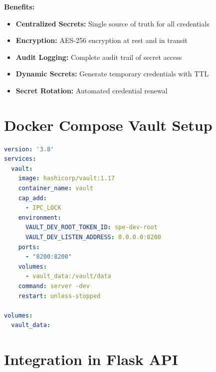 \documentclass[12pt,a4paper]{report}
\begin{document}
\textbf{Benefits:}
\begin{itemize}[leftmargin=2em]
    \item \textbf{Centralized Secrets:} Single source of truth for all credentials
    \item \textbf{Encryption:} AES-256 encryption at rest and in transit
    \item \textbf{Audit Logging:} Complete audit trail of secret access
    \item \textbf{Dynamic Secrets:} Generate temporary credentials with TTL
    \item \textbf{Secret Rotation:} Automated credential renewal
\end{itemize}

\section{Docker Compose Vault Setup}

\begin{lstlisting}[language=yaml, caption={docker-compose.vault.yml}]
version: '3.8'
services:
  vault:
    image: hashicorp/vault:1.17
    container_name: vault
    cap_add:
      - IPC_LOCK
    environment:
      VAULT_DEV_ROOT_TOKEN_ID: spe-dev-root
      VAULT_DEV_LISTEN_ADDRESS: 0.0.0.0:8200
    ports:
      - "8200:8200"
    volumes:
      - vault_data:/vault/data
    command: server -dev
    restart: unless-stopped

volumes:
  vault_data:
\end{lstlisting}

\section{Integration in Flask API}
\end{document}
